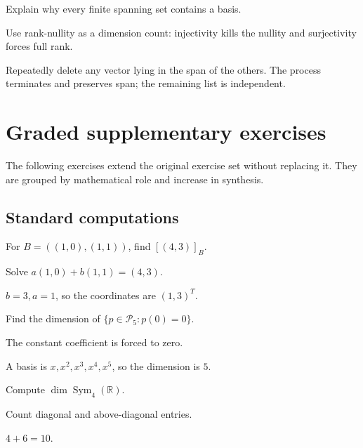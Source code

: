 \begin{exercise}\label{exr:i03-08}
Explain why every finite spanning set contains a basis.
\end{exercise}
\begin{hint}
Use rank-nullity as a dimension count: injectivity kills the nullity and surjectivity forces full rank.
\end{hint}
\begin{solution}
Repeatedly delete any vector lying in the span of the others. The process terminates and preserves span; the remaining list is independent.
\end{solution}


\section{Graded supplementary exercises}
The following exercises extend the original exercise set without replacing it. They are grouped by mathematical role and increase in synthesis.

\subsection*{Standard computations}

\begin{exercise}\label{exr:i03-expand-01}
For \(B=((1,0),(1,1))\), find \([(4,3)]_B\).
\end{exercise}
\begin{hint}
Solve \(a(1,0)+b(1,1)=(4,3)\).
\end{hint}
\begin{solution}
\(b=3,a=1\), so the coordinates are \((1,3)^T\).
\end{solution}

\begin{exercise}\label{exr:i03-expand-02}
Find the dimension of \(\{p\in\mathcal P_5:p(0)=0\}\).
\end{exercise}
\begin{hint}
The constant coefficient is forced to zero.
\end{hint}
\begin{solution}
A basis is \(x,x^2,x^3,x^4,x^5\), so the dimension is \(5\).
\end{solution}

\begin{exercise}\label{exr:i03-expand-03}
Compute \(\dim\operatorname{Sym}_4(\mathbb R)\).
\end{exercise}
\begin{hint}
Count diagonal and above-diagonal entries.
\end{hint}
\begin{solution}
\(4+6=10\).
\end{solution}

